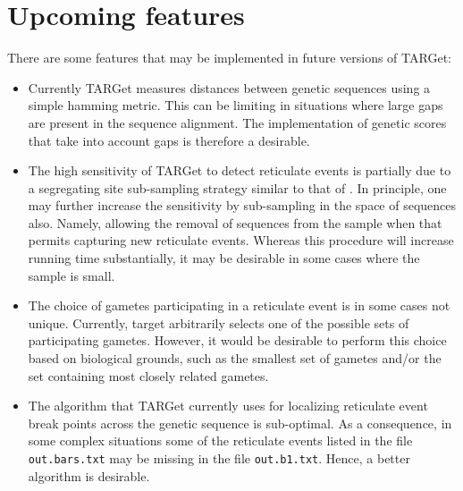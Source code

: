 \documentclass[12pt]{article}
\begin{document}
\section{Upcoming features}

There are some features that may be implemented in future versions of TARGet:

\begin{itemize}
\item Currently TARGet measures distances between genetic sequences using a simple hamming metric. This can be limiting in situations where large gaps are present in the sequence alignment. The implementation of genetic scores that take into account gaps is therefore a desirable.

\item The high sensitivity of TARGet to detect reticulate events is partially due to a segregating site sub-sampling strategy similar to that of \cite{mg}. In principle, one may further increase the sensitivity by sub-sampling in the space of sequences also. Namely, allowing the removal of sequences from the sample when that permits capturing new reticulate events. Whereas this procedure will increase running time substantially, it may be desirable in some cases where the sample is small.

\item The choice of gametes participating in a reticulate event is in some cases not unique. Currently, target arbitrarily selects one of the possible sets of participating gametes. However, it would be desirable to perform this choice based on biological grounds, such as the smallest set of gametes and/or the set containing most closely related gametes.

\item The algorithm that TARGet currently uses for localizing reticulate event break points across the genetic sequence is sub-optimal. As a consequence, in some complex situations some of the reticulate events listed in the file \texttt{out.bars.txt} may be missing in the file \texttt{out.b1.txt}. Hence, a better algorithm is desirable.
\end{itemize}
\end{document}
